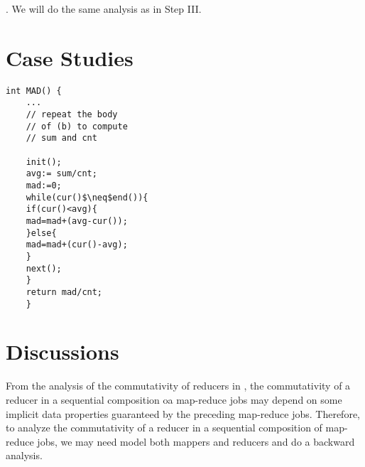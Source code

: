 \documentclass[runningheads,a4paper]{llncs}
\begin{document}
\smallskip

. We will do the same analysis as in Step III.




\section{Case Studies}

	\begin{lstlisting}[mathescape=true]
	int MAD() {
	...
	// repeat the body  
	// of (b) to compute
	// sum and cnt
	
	init();
	avg:= sum/cnt;
	mad:=0;
	while(cur()$\neq$end()){
	if(cur()<avg){
	mad=mad+(avg-cur());
	}else{
	mad=mad+(cur()-avg);
	}
	next();
	}
	return mad/cnt;
	}
	\end{lstlisting}
	
\section{Discussions}

From the analysis of the commutativity of reducers in \cite{XZZ+14}, the commutativity of a reducer in a sequential composition oa map-reduce jobs may depend on some implicit data properties guaranteed by the preceding map-reduce jobs. Therefore, to analyze the commutativity of a reducer in a sequential composition of map-reduce jobs, we may need model both mappers and reducers and do a backward analysis.





\newpage
\end{document}
